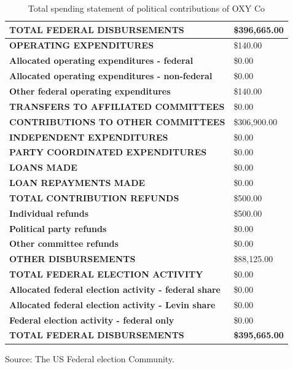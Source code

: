 \documentclass[
	a4paper, %
	12pt,%
]{CSSullivanBusinessReport}
\begin{document}
\begin{fullwidth}
\begin{appendices}
\begin{table}[!ht]\footnotesize
    \centering
    \caption{Total spending statement of political contributions of OXY Co}
    \begin{tabular}{ll}
    \hline
        \textbf{TOTAL FEDERAL DISBURSEMENTS} & \textbf{\$396,665.00}\\\hline
        \quad \textbf{OPERATING EXPENDITURES} & \$140.00   \\ 
        \quad \textbf{Allocated operating expenditures - federal} & \$0.00   \\ 
        \quad \textbf{Allocated operating expenditures - non-federal} & \$0.00   \\ 
        \textbf{Other federal operating expenditures} & \$140.00   \\ 
        \textbf{TRANSFERS TO AFFILIATED COMMITTEES} & \$0.00   \\ 
        \textbf{CONTRIBUTIONS TO OTHER COMMITTEES} & \$306,900.00   \\ 
        \textbf{INDEPENDENT EXPENDITURES} & \$0.00   \\ 
        \textbf{PARTY COORDINATED EXPENDITURES} & \$0.00   \\ 
        \textbf{LOANS MADE} & \$0.00   \\ 
        \textbf{LOAN REPAYMENTS MADE} & \$0.00   \\ 
        \textbf{TOTAL CONTRIBUTION REFUNDS} & \$500.00   \\ 
        \quad \textbf{Individual refunds} & \$500.00   \\ 
        \quad \textbf{Political party refunds} & \$0.00   \\ 
        \quad \textbf{Other committee refunds} & \$0.00   \\ 
        \textbf{OTHER DISBURSEMENTS} & \$88,125.00   \\ 
        \textbf{TOTAL FEDERAL ELECTION ACTIVITY} & \$0.00   \\ 
        \quad \textbf{Allocated federal election activity - federal share} & \$0.00   \\ 
        \quad \textbf{Allocated federal election activity - Levin share} & \$0.00   \\ 
        \quad \textbf{Federal election activity - federal only} & \$0.00   \\ \hline
        \textbf{TOTAL FEDERAL DISBURSEMENTS} & \textbf{\$395,665.00}   \\ \hline
    \end{tabular}
    Source: The US Federal election Community.

\end{table}
\end{appendices}
\end{fullwidth}
\end{document}

